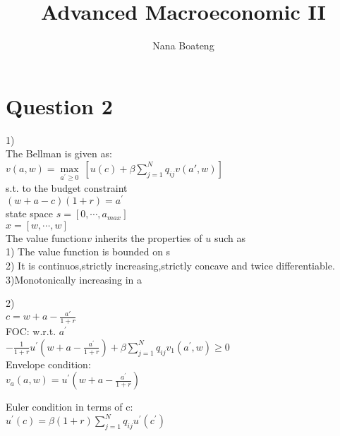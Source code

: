 \documentclass[11pt]{article}
\title{Advanced Macroeconomic II}
\author{Nana Boateng}
\date{}
\begin{document}
\maketitle
\section{Question 2}

1)\\

The Bellman is given as:\\

$v(a,w)=\max  \limits_{a^{\prime} \geq 0} \ [ u(c)+\beta\sum_{j=1}^{N} q_{ij}v(a\prime 
,w)]$\\

s.t. to the budget constraint\\

$(w+a-c)(1+r)=a^{\prime}$\\

state space $s=[0,\cdots ,a_{max}]$\\
                    $x=[w,\cdots,w]$\\
   
   
 The value function$v$ inherits the properties of $u$ such as\\
 
1)  The value function is bounded on s\\
2) It is continuos,strictly increasing,strictly concave and twice 
differentiable.\\
3)Monotonically increasing in a



2)\\
$c=w+a-\frac{a\prime}{1+r}$\\

FOC: w.r.t. $a^{\prime}$\\

$-\frac{1}{1+r} u^{\prime}\left(  w+a-\frac{a^{\prime}}{1+r}\right)+\beta\sum_{j=1}^{N}q_{ij}v_{1}(a^{\prime},w) \geq 
0$\\

 Envelope condition:\\
 
 $v_{a}(a,w)=u^{\prime}\left( w+a-\frac{a^{\prime}}{1+r} \right)$
 
 Euler condition in terms of c:\\
 
 $u^{\prime}(c)=\beta (1+r) \sum_{j=1}^{N}q_{ij}u^{\prime}(c^\prime)$\\
 
\end{document}
